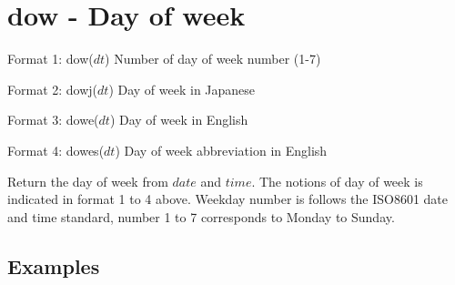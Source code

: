 
%

\section{dow - Day of week\label{sect:dow}}

Format 1: dow($dt$) Number of day of week number (1-7)

Format 2: dowj($dt$) Day of week in Japanese

Format 3: dowe($dt$) Day of week in English 

Format 4: dowes($dt$) Day of week abbreviation in English

Return the day of week from $date$ and $time$. The notions of day of week is indicated in format 1 to 4 above. Weekday number is follows the ISO8601 date and time standard, number 1 to 7 corresponds to Monday to Sunday. 


\subsection*{Examples}


%

